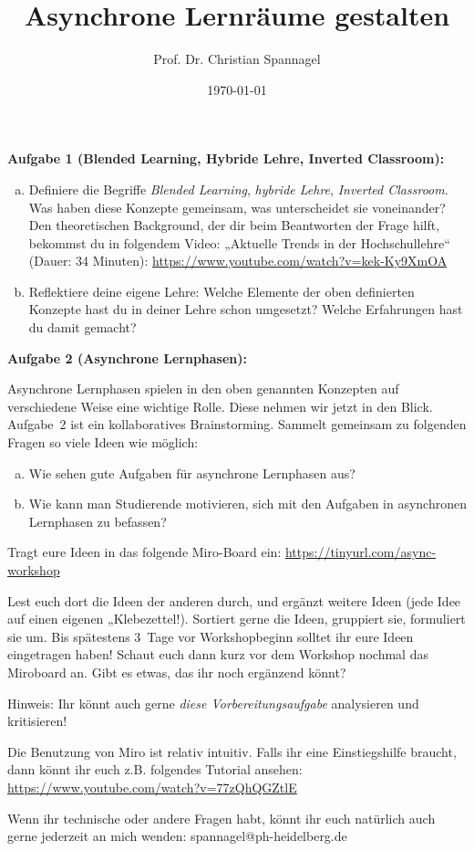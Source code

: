 \documentclass{../cssheet}
\title{Asynchrone Lernräume gestalten}
\author{Prof. Dr. Christian Spannagel}
\date{\today}
\begin{document}
\printtitle
\printsubtitle

\textbf{Aufgabe 1 (Blended Learning, Hybride Lehre, Inverted Classroom):} 

\begin{enumerate}[a)]
\item Definiere die Begriffe \emph{Blended Learning}, \emph{hybride Lehre}, \emph{Inverted Classroom}. Was haben diese Konzepte gemeinsam, was unterscheidet sie voneinander?
Den theoretischen Background, der dir beim Beantworten der Frage hilft, bekommst du in folgendem Video: „Aktuelle Trends in der Hochschullehre“ (Dauer: 34 Minuten): \url{https://www.youtube.com/watch?v=kek-Ky9XmOA}
\item Reflektiere deine eigene Lehre: Welche Elemente der oben definierten Konzepte hast du in deiner Lehre schon umgesetzt? Welche Erfahrungen hast du damit gemacht?
\end{enumerate}


\textbf{Aufgabe 2 (Asynchrone Lernphasen):} 

Asynchrone Lernphasen spielen in den oben genannten Konzepten auf verschiedene Weise eine wichtige Rolle. Diese nehmen wir jetzt in den Blick. Aufgabe~2 ist ein kollaboratives Brainstorming. Sammelt gemeinsam zu folgenden Fragen so viele Ideen wie möglich:

\begin{enumerate}[a)]
\item Wie sehen gute Aufgaben für asynchrone Lernphasen aus?
\item Wie kann man Studierende motivieren, sich mit den Aufgaben in asynchronen Lernphasen zu befassen?
\end{enumerate}

Tragt eure Ideen in das folgende Miro-Board ein: \url{https://tinyurl.com/async-workshop}

Lest euch dort die Ideen der anderen durch, und ergänzt weitere Ideen (jede Idee auf einen eigenen „Klebezettel!). Sortiert gerne die Ideen, gruppiert sie, formuliert sie um. Bis spätestens 3~Tage vor Workshopbeginn solltet ihr eure Ideen eingetragen haben! Schaut euch dann kurz vor dem Workshop nochmal das Miroboard an. Gibt es etwas, das ihr noch ergänzend könnt? 

Hinweis: Ihr könnt auch gerne \emph{diese Vorbereitungsaufgabe} analysieren und kritisieren!

Die Benutzung von Miro ist relativ intuitiv. Falls ihr eine Einstiegshilfe braucht, dann könnt ihr euch z.B. folgendes Tutorial ansehen: \url{https://www.youtube.com/watch?v=77zQhQGZtlE}

Wenn ihr technische oder andere Fragen habt, könnt ihr euch natürlich auch gerne jederzeit an mich wenden: spannagel@ph-heidelberg.de 


\vspace*{10mm}
\printlicense

\printsocials


\end{document}
